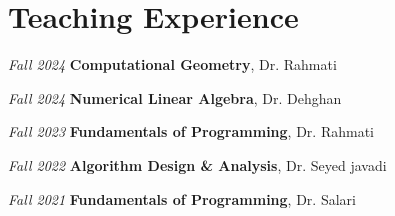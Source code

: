


\section{Teaching Experience} 
\begin{twocolentry}{
		\textit{Fall 2024}}
	\textbf{Computational Geometry}, Dr. Rahmati
\end{twocolentry}
\begin{twocolentry}{
		\textit{Fall 2024}}
	\textbf{Numerical Linear Algebra}, Dr. Dehghan
\end{twocolentry}
\begin{twocolentry}{
		\textit{Fall 2023}}
	\textbf{Fundamentals of Programming}, Dr. Rahmati
\end{twocolentry}
\begin{twocolentry}{
		\textit{Fall 2022}}
	\textbf{Algorithm Design \& Analysis}, Dr. Seyed javadi
\end{twocolentry}
\begin{twocolentry}{
		\textit{Fall 2021}}
	\textbf{Fundamentals of Programming}, Dr. Salari
\end{twocolentry}
